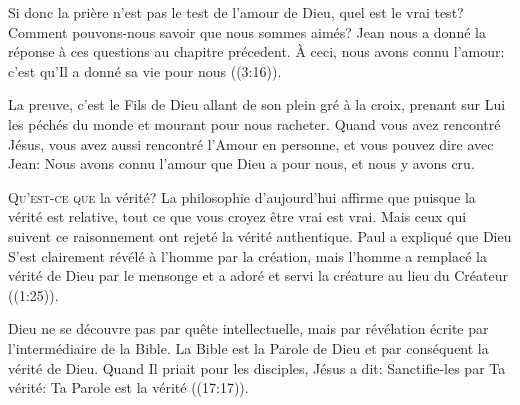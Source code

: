 Si donc la prière n'est pas le test de l'amour de Dieu, quel est le vrai test?
 Comment pouvons-nous savoir que nous sommes aimés?
 Jean nous a donné la réponse à ces questions au chapitre précedent.
 \Og À ceci, nous avons connu l'amour:
 c'est qu'Il a donné sa vie pour nous \Fg{} ((3:16)). 


La preuve, c'est le Fils de Dieu allant de son plein gré à la croix,
 prenant sur Lui les péchés du monde et mourant pour nous racheter.
 Quand vous avez rencontré Jésus, vous avez aussi rencontré
 l'Amour en personne, et vous pouvez dire avec Jean: 
 \Og Nous avons connu l'amour que Dieu a pour nous, et nous y avons cru. \Fg{}

\dvrule








\lettrine{Q}{u'est-ce que} la vérité?
 La philosophie d'aujourd'hui affirme que 
 \Og puisque la vérité est relative, \Fg{} 
 tout ce que vous croyez être vrai est vrai.
 Mais ceux qui suivent ce raisonnement ont rejeté la vérité authentique.
 Paul a expliqué que Dieu S'est clairement révélé à l'homme par la création,
 mais l'homme \Og a remplacé la vérité de Dieu par le mensonge
 et a adoré et servi la créature au lieu du Créateur \Fg{}
 ((1:25)). 


Dieu ne se découvre pas par quête intellectuelle, mais par révélation écrite
 \ocadr par l'intermédiaire de la Bible.
 La Bible est la Parole de Dieu et par conséquent la vérité de Dieu.
 Quand Il priait pour les disciples, Jésus a dit: 
 \Og Sanctifie-les par Ta vérité: Ta Parole est la vérité \Fg{} 
 ((17:17)). 


